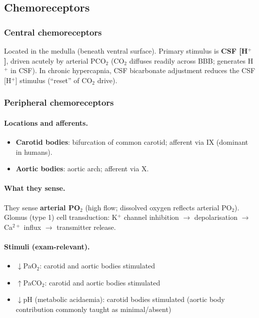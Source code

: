 \documentclass[11pt,a4paper]{article}
\begin{document}
\subsection{Chemoreceptors}
\subsubsection{Central chemoreceptors}
Located in the medulla (beneath ventral surface). Primary stimulus is \textbf{CSF [H$^+$]}, driven acutely by arterial PCO$_2$ (CO$_2$ diffuses readily across BBB; generates H$^+$ in CSF). In chronic hypercapnia, CSF bicarbonate adjustment reduces the CSF [H$^+$] stimulus (``reset'' of CO$_2$ drive).

\subsubsection{Peripheral chemoreceptors}
\paragraph{Locations and afferents.}
\begin{itemize}
  \item \textbf{Carotid bodies}: bifurcation of common carotid; afferent via IX (dominant in humans).
  \item \textbf{Aortic bodies}: aortic arch; afferent via X.
\end{itemize}

\paragraph{What they sense.}
They sense \textbf{arterial PO$_2$} (high flow; dissolved oxygen reflects arterial PO$_2$). Glomus (type 1) cell transduction: K$^+$ channel inhibition $\rightarrow$ depolarisation $\rightarrow$ Ca$^{2+}$ influx $\rightarrow$ transmitter release.

\paragraph{Stimuli (exam-relevant).}
\begin{itemize}
  \item $\downarrow$PaO$_2$: carotid and aortic bodies stimulated
  \item $\uparrow$PaCO$_2$: carotid and aortic bodies stimulated
  \item $\downarrow$pH (metabolic acidaemia): carotid bodies stimulated (aortic body contribution commonly taught as minimal/absent)
\end{itemize}
\end{document}
